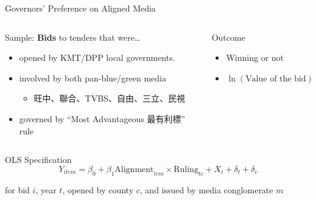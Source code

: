 \documentclass[
  10pt,
  ignorenonframetext,
  aspectratio=169,
]{beamer}
\providecommand{\tightlist}{%
  \setlength{\itemsep}{0pt}\setlength{\parskip}{0pt}}
\begin{document}
\begin{frame}{Governors' Preference on Aligned Media}
\protect\hypertarget{governors-preference-on-aligned-media}{}
\begin{columns}[T]
\begin{column}{0.6\textwidth}
\begin{block}{Sample:}
\protect\hypertarget{sample}{}
\textbf{Bids} to tenders that were\ldots{}

\begin{itemize}
\tightlist
\item
  opened by KMT/DPP local governments.
\item
  involved by both pan-blue/green media

  \begin{itemize}
  \tightlist
  \item
    旺中、聯合、TVBS、自由、三立、民視
  \end{itemize}
\item
  governed by ``Most Advantageous 最有利標'' rule
\end{itemize}
\end{block}
\end{column}

\begin{column}{0.3\textwidth}
\begin{block}{Outcome}
\protect\hypertarget{outcome}{}
\begin{itemize}
\tightlist
\item
  Winning or not
\item
  \(\ln(\text{Value of the bid})\)
\end{itemize}
\end{block}
\end{column}
\end{columns}

\begin{block}{OLS Specification}
\protect\hypertarget{ols-specification}{}
\[
Y_{itcm} = \beta_0 + \beta_1 \text{Alignment}_{tcm} \times \text{Ruling}_{tc} + X_i + \delta_t + \delta_c
\]

for bid \(i\), year \(t\), opened by county \(c\), and issued by media
conglomerate \(m\)
\end{block}
\end{frame}

\begin{frame}

\end{frame}

\begin{frame}

\end{frame}
\end{document}
